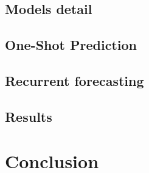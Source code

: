 \documentclass[%
    corpo=12pt,
    twoside,
    oldstyle,
    autoretitolo,
    greek,
    evenboxes,
]{toptesi}
\begin{document}
\section{Models detail}
\section{One-Shot Prediction}
\section{Recurrent forecasting}
\section{Results}


%



\chapter{Conclusion}





\end{document}
